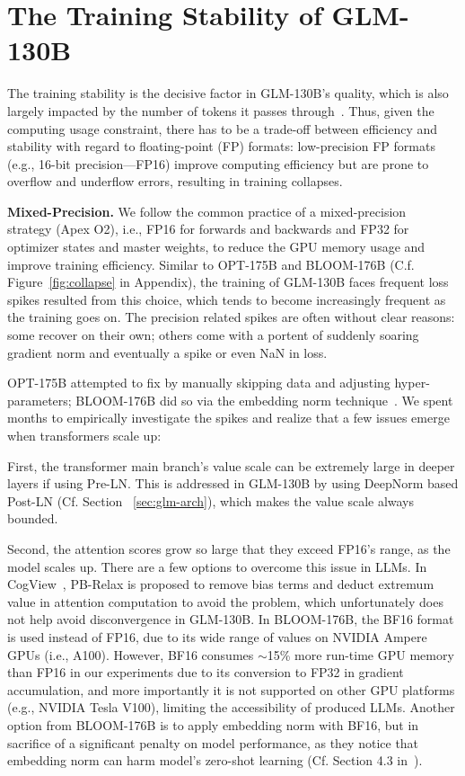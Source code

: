 \section{The Training Stability of GLM-130B}

The training stability is the decisive factor in GLM-130B's quality, which is also largely impacted by the number of tokens it passes through~\citep{hoffmann2022training}. Thus, given the computing usage constraint, there has to be a trade-off between efficiency and stability with regard to floating-point (FP) formats: low-precision FP formats (e.g., 16-bit precision---FP16) improve computing efficiency but are prone to overflow and underflow errors, resulting in training collapses. 

\textbf{Mixed-Precision.}
We follow the common practice of a mixed-precision~\citep{micikevicius2018mixed} strategy (Apex O2), i.e., FP16 for forwards and backwards and FP32 for optimizer states and master weights, to reduce the GPU memory usage and improve training efficiency. Similar to OPT-175B and BLOOM-176B (C.f. Figure~\ref{fig:collapse} in Appendix), the training of GLM-130B faces frequent loss spikes resulted from this choice, which tends to become increasingly frequent as the training goes on. The precision related spikes are often without clear reasons: some recover on their own; others come with a portent of suddenly soaring gradient norm and eventually a spike or even NaN in loss. 

OPT-175B attempted to fix by manually skipping data and adjusting hyper-parameters; BLOOM-176B did so via the embedding norm technique~\citep{dettmers20218}. We spent months to empirically investigate the spikes and realize that a few issues emerge when transformers scale up: 

First, the transformer main branch's value scale can be extremely large in deeper layers if using Pre-LN. This is addressed in GLM-130B by using DeepNorm based Post-LN (Cf.  Section ~\ref{sec:glm-arch}), which makes the value scale always bounded. 

Second, the attention scores grow so large that they exceed FP16's range, as the model scales up. There are a few options to overcome this issue in LLMs. In CogView~\citep{ding2021cogview}, PB-Relax is proposed to remove bias terms and deduct extremum value in attention computation to avoid the problem, which unfortunately does not help avoid disconvergence in GLM-130B. In BLOOM-176B, the BF16 format is used instead of FP16, due to its wide range of values on NVIDIA Ampere GPUs (i.e., A100). However, BF16 consumes $\sim$15\% more run-time GPU memory than FP16 in our experiments due to its conversion to FP32 in gradient accumulation, and more importantly it is not supported on other GPU platforms (e.g., NVIDIA Tesla V100), limiting the accessibility of produced LLMs. Another option from BLOOM-176B is to apply embedding norm with BF16, but in sacrifice of a significant penalty on model performance, as they notice that embedding norm can harm model's zero-shot learning (Cf. Section 4.3 in~\citep{scao2022what}). 

